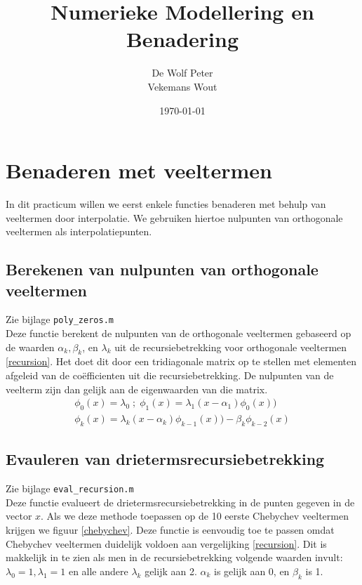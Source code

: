 \documentclass[a4paper, 12pt, titlepage]{report}
\begin{document}
\title{\textbf{Numerieke Modellering en Benadering}}
\author{De Wolf Peter\\ Vekemans Wout}

\date{\today}
\begin{titlepage}
	\maketitle
	\thispagestyle{empty}
\end{titlepage}

\newpage

\listoffigures

\newpage
\section{Benaderen met veeltermen}
In dit practicum willen we eerst enkele functies benaderen met behulp van veeltermen door interpolatie. We gebruiken hiertoe nulpunten van orthogonale veeltermen als interpolatiepunten.
\subsection{Berekenen van nulpunten van orthogonale veeltermen}
Zie bijlage \texttt{poly\_zeros.m}\\
Deze functie berekent de nulpunten van de orthogonale veeltermen gebaseerd op de waarden $\alpha_k, \beta_k$, en $\lambda_k$ uit de recursiebetrekking voor orthogonale veeltermen \eqref{recursion}. Het doet dit door een tridiagonale matrix op te stellen met elementen afgeleid van de co\"efficienten uit die recursiebetrekking. De nulpunten van de veelterm zijn dan gelijk aan de eigenwaarden van die matrix.\\
\begin{subequations} \label{recursion}
\begin{align}
\phi_0(x) = \lambda_0\; ;\; \phi_1(x) = \lambda_1(x-\alpha_1)\phi_0(x))\\
\phi_k(x) = \lambda_k(x-\alpha_k)\phi_{k-1}(x))-\beta_k\phi_{k-2}(x)
\end{align}
\end{subequations}

\subsection{Evauleren van drietermsrecursiebetrekking}
Zie bijlage \texttt{eval\_recursion.m}\\
Deze functie evalueert de drietermsrecursiebetrekking in de punten gegeven in de vector $x$. Als we deze methode toepassen op de 10 eerste Chebychev veeltermen krijgen we figuur \ref{chebychev}. Deze functie is eenvoudig toe te passen omdat Chebychev veeltermen duidelijk voldoen aan vergelijking \eqref{recursion}. Dit is makkelijk in te zien als men in de recursiebetrekking volgende waarden invult: $\lambda_0=1, \lambda_1=1$ en alle andere $\lambda_k$ gelijk aan 2. $\alpha_k$ is gelijk aan 0, en $\beta_k$ is 1. \\
\end{document}

